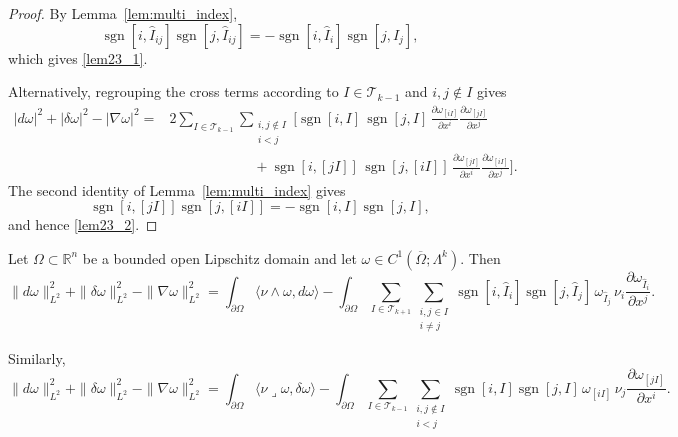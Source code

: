 \begin{proof}
By Lemma~\ref{lem:multi_index},
\[
    \operatorname{sgn}[i,\widehat{I}_{ij}]
    \operatorname{sgn}[j,\widehat{I}_{ij}]
    =
    -
    \operatorname{sgn}[i,\widehat{I}_i]
    \operatorname{sgn}[j,\widehat{I}_j],
\]
which gives \eqref{lem23_1}.

Alternatively, regrouping the cross terms according to
$I\in\mathscr{T}_{k-1}$ and $i,j\notin I$ gives
\[
\begin{aligned}
|d\omega|^2+|\delta\omega|^2-|\nabla\omega|^2
={}&
2\sum_{I\in\mathscr{T}_{k-1}}
\sum_{\substack{i,j\notin I\\i<j}}
\Bigg[
\operatorname{sgn}[i,I]\,
\operatorname{sgn}[j,I]\,
\frac{\partial\omega_{[iI]}}{\partial x^i}
\frac{\partial\omega_{[jI]}}{\partial x^j}
\\
&\qquad\qquad\qquad+
\operatorname{sgn}[i,[jI]]\,
\operatorname{sgn}[j,[iI]]\,
\frac{\partial\omega_{[jI]}}{\partial x^i}
\frac{\partial\omega_{[iI]}}{\partial x^j}
\Bigg].
\end{aligned}
\]
The second identity of Lemma~\ref{lem:multi_index} gives
\[
    \operatorname{sgn}[i,[jI]]
    \operatorname{sgn}[j,[iI]]
    =
    -
    \operatorname{sgn}[i,I]\operatorname{sgn}[j,I],
\]
and hence \eqref{lem23_2}.
\end{proof}

\begin{lemma}
\label{lemma:boundary_identity}
Let $\Omega\subset\mathbb{R}^n$ be a bounded open Lipschitz domain and let
$\omega\in C^1(\overline{\Omega};\Lambda^k)$. Then
\begin{equation}
\label{eq:boundary_identity_wedge}
\|d\omega\|_{L^2}^2+\|\delta\omega\|_{L^2}^2-\|\nabla\omega\|_{L^2}^2
=
\int_{\partial\Omega}\langle \nu\wedge\omega,d\omega\rangle
-
\int_{\partial\Omega}
\sum_{I\in\mathscr T_{k+1}}
\sum_{\substack{i,j\in I\\ i\neq j}}
\operatorname{sgn}[i,\widehat I_i]
\operatorname{sgn}[j,\widehat I_j]
\,\omega_{\widehat I_j}\,
\nu_i
\frac{\partial\omega_{\widehat I_i}}{\partial x^j}.
\end{equation}

Similarly,
\begin{equation}
\label{eq:boundary_identity_contraction}
\|d\omega\|_{L^2}^2+\|\delta\omega\|_{L^2}^2-\|\nabla\omega\|_{L^2}^2
=
\int_{\partial\Omega}\langle \nu\lrcorner\omega,\delta\omega\rangle
-
\int_{\partial\Omega}
\sum_{I\in\mathscr T_{k-1}}
\sum_{\substack{i,j\notin I\\ i<j}}
\operatorname{sgn}[i,I]\operatorname{sgn}[j,I]\,
\omega_{[iI]}\,
\nu_j
\frac{\partial\omega_{[jI]}}{\partial x^i}.
\end{equation}
\end{lemma}

